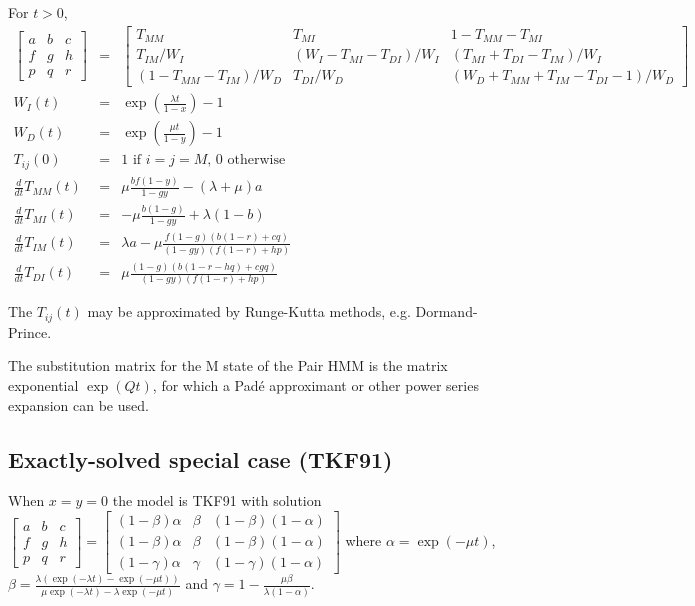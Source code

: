 \documentclass{article}
\begin{document}
For $t>0$, %
\begin{eqnarray*}
\begin{bmatrix}
a & b & c \\
f & g & h \\
p & q & r 
\end{bmatrix}
& = &
\begin{bmatrix}
T_{MM} & T_{MI} & 1-T_{MM}-T_{MI} \\
T_{IM}/W_I & (W_I-T_{MI}-T_{DI})/W_I & (T_{MI}+T_{DI}-T_{IM})/W_I \\
(1-T_{MM}-T_{IM})/W_D & T_{DI}/W_D & (W_D+T_{MM}+T_{IM}-T_{DI}-1)/W_D 
\end{bmatrix}
\\
W_I(t) & = & \exp\left(\frac{\lambda t}{1-x}\right)-1 \\
W_D(t) & = & \exp\left(\frac{\mu t}{1-y}\right)-1 \\
T_{ij}(0) & = & \mbox{1 if $i=j=M$, 0 otherwise}
\\
  \frac{d}{dt} T_{MM}(t) & = &
  \mu \frac{b f (1-y)}{1 - g y}-(\lambda +\mu )a
  \nonumber \\
  \frac{d}{dt} T_{MI}(t) & = &
  -\mu \frac{b (1-g)}{1 - g y} + \lambda (1-b)
  \nonumber \\
  \frac{d}{dt} T_{IM}(t) & = &
  \lambda a - \mu \frac{f (1-g) (b (1-r)+c q)}{(1 - g y) (f (1-r)+h p)}
  \nonumber \\
  \frac{d}{dt} T_{DI}(t) & = &
  \mu \frac{(1-g) (b (1-r-h q)+c g q)}{(1-g y) (f (1-r)+h p)}
\end{eqnarray*}

The $T_{ij}(t)$ may be approximated by Runge-Kutta methods,
e.g. Dormand-Prince. %

The substitution matrix for the M state of the Pair HMM is
the matrix exponential $\exp(Qt)$, for which a Pad\'{e} approximant
or other power series expansion can be used. %

\subsection{Exactly-solved special case (TKF91)}

When $x=y=0$ the model is TKF91 \cite{ThorneEtAl91}
with solution
$
\begin{bmatrix}
a & b & c \\
f & g & h \\
p & q & r 
\end{bmatrix}
=
\begin{bmatrix}
(1-\beta)\alpha & \beta & (1-\beta)(1-\alpha) \\
(1-\beta)\alpha & \beta & (1-\beta)(1-\alpha) \\
(1-\gamma)\alpha & \gamma & (1-\gamma)(1-\alpha)
\end{bmatrix}
$
where
$\alpha = \exp(-\mu t)$,
$\beta = \frac{\lambda \left( \exp(-\lambda t) - \exp(-\mu t) \right)}{\mu \exp(-\lambda t) - \lambda \exp(-\mu t)}$
and
$\gamma = 1 - \frac{\mu \beta}{\lambda (1 - \alpha)}$.
\end{document}
